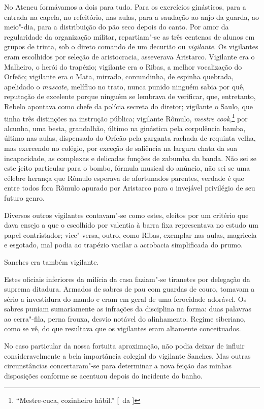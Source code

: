 No Ateneu formávamos a dois para tudo.
Para os exercícios ginásticos, para a entrada na capela, no refeitório,
nas aulas, para a saudação ao anjo da guarda, ao meio"-dia, para a
distribuição do pão seco depois do canto. Por amor da 
regularidade da organização militar,
repartiam"-se as três centenas de alunos em grupos de trinta, sob o
direto comando de um decurião ou \textit{vigilante}. Os vigilantes eram
escolhidos por seleção de aristocracia, asseverava Aristarco. Vigilante
era o Malheiro, o herói do trapézio; vigilante era o Ribas, a melhor
vocalização do Orfeão; vigilante era o Mata, mirrado, corcundinha, de
espinha quebrada, apelidado o \textit{mascate}, melífluo no trato, nunca punido
ninguém sabia por quê, reputação de excelente porque ninguém se
lembrava de verificar, que, entretanto, Rebelo apontava como chefe da
polícia secreta do diretor; vigilante o Saulo, que tinha três
distinções na instrução pública; vigilante Rômulo, \textit{mestre cook},\footnote{ ``Mestre-cuca, 
cozinheiro hábil.'' [~da ]} por
alcunha, uma besta, grandalhão, último na ginástica pela corpulência
bamba, último nas aulas, dispensado do Orfeão pela garganta rachada de
requinta velha, mas exercendo no colégio, por exceção de saliência na
largura chata da sua incapacidade, as complexas e delicadas funções de
zabumba da banda. Não sei se este jeito particular para o bombo,
fórmula musical do anúncio, não sei se uma célebre herança que Rômulo
esperava de afortunados parentes, verdade é que entre todos fora Rômulo
apurado por Aristarco para o invejável privilégio de seu futuro genro.

Diversos outros vigilantes contavam"-se como estes, eleitos por um
critério que dava ensejo a que o escolhido por valentia à barra fixa
representava no estudo um papel contristador; vice"-versa, outro, como
Ribas, exemplar nas aulas, magricela e esgotado, mal podia ao trapézio
vacilar a acrobacia simplificada do prumo. 

Sanches era também vigilante. 

Estes oficiais inferiores da milícia da casa faziam"-se
tiranetes por delegação da suprema ditadura. Armados de sabres de pau
com guardas de couro, tomavam a sério a investidura do mando e eram em
geral de uma ferocidade adorável. Os sabres puniam sumariamente as
infrações da disciplina na forma: duas palavras ao cerra"-fila, perna
frouxa, desvio notável do alinhamento. Regime siberiano, como se vê, do
que resultava que os vigilantes eram altamente conceituados. 

No caso particular da nossa fortuita aproximação, não podia deixar de influir
consideravelmente a bela importância colegial do vigilante Sanches. Mas
outras circunstâncias concertaram"-se para determinar a nova feição
das minhas disposições conforme se acentuou depois do incidente do banho. 

